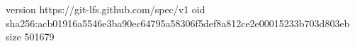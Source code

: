 version https://git-lfs.github.com/spec/v1
oid sha256:acb01916a5546e3ba90ec64795a58306f5def8a812ce2e00015233b703d803eb
size 501679
